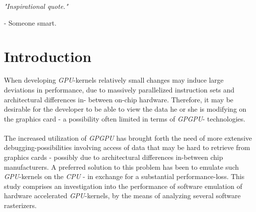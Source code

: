 \documentclass[fleqn,10pt]{SelfArx} %
\affiliation{EricNNilsson@gmail.com}
\newlength{\tocsep}
\begin{document}
\flushbottom %
\maketitle %

\noindent
\textit{"Inspirational quote."}
\begin{center}
- Someone smart.
\end{center}

\tableofcontents %
\thispagestyle{empty} %

\section*{Introduction} %
\label{sec:introduction}
When developing \textit{GPU}-kernels relatively small changes may induce large deviations in performance, due to massively parallelized instruction sets and architectural differences in-
between on-chip hardware. Therefore, it may be desirable for the developer to be able to view the data he or she is modifying on the graphics card - a possibility often limited in terms of \textit{GPGPU}-
technologies.\\
\\
The increased utilization of \textit{GPGPU} has brought forth the need of more extensive debugging-possibilities involving access of data that may be hard to retrieve from graphics cards - possibly due to architectural differences in-between chip manufacturers. A preferred solution to this problem has been to emulate such \textit{GPU}-kernels on the \textit{CPU} - in exchange for a substantial performance-loss. This study comprises an investigation into the performance of software emulation of hardware accelerated \textit{GPU}-kernels, by the means of analyzing several software rasterizers.\\
\end{document}
